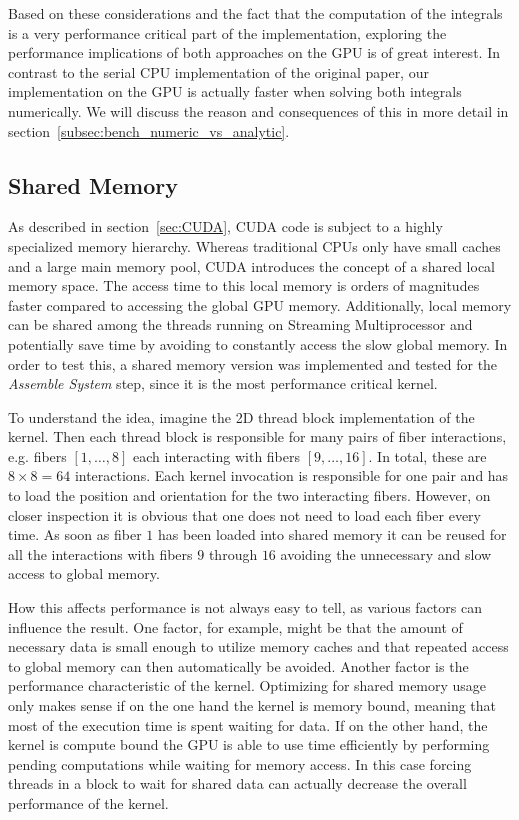 Based on these considerations and the fact that the computation of the integrals is a very performance critical part of the implementation, exploring the performance implications of both approaches on the GPU is of great interest. In contrast to the serial CPU implementation of the original paper, our implementation on the GPU is actually faster when solving both integrals numerically. We will discuss the reason and consequences of this in more detail in section~\ref{subsec:bench_numeric_vs_analytic}.

\subsection{Shared Memory}
\label{subsec:shared_memory}

As described in section~\ref{sec:CUDA}, CUDA code is subject to a highly specialized memory hierarchy. Whereas traditional CPUs only have small caches and a large main memory pool, CUDA introduces the concept of a shared local memory space. The access time to this local memory is orders of magnitudes faster compared to accessing the global GPU memory. Additionally, local memory can be shared among the threads running on Streaming Multiprocessor and potentially save time by avoiding to constantly access the slow global memory. In order to test this, a shared memory version was implemented and tested for the \emph{Assemble System} step, since it is the most performance critical kernel.

To understand the idea, imagine the 2D thread block implementation of the kernel. Then each thread block is responsible for many pairs of fiber interactions, e.g. fibers $[1,\dots,8]$ each interacting with fibers $[9,\dots,16]$. In total, these are $8 \times 8 = 64$ interactions. Each kernel invocation is responsible for one pair and has to load the position and orientation for the two interacting fibers. However, on closer inspection it is obvious that one does not need to load each fiber every time. As soon as fiber $1$ has been loaded into shared memory it can be reused for all the interactions with fibers $9$ through $16$ avoiding the unnecessary and slow access to global memory.

How this affects performance is not always easy to tell, as various factors can influence the result. One factor, for example, might be that the amount of necessary data is small enough to utilize memory caches and that repeated access to global memory can then automatically be avoided. Another factor is the performance characteristic of the kernel. Optimizing for shared memory usage only makes sense if on the one hand the kernel is memory bound, meaning that most of the execution time is spent waiting for data. If on the other hand, the kernel is compute bound the GPU is able to use time efficiently by performing pending computations while waiting for memory access. In this case forcing threads in a block to wait for shared data can actually decrease the overall performance of the kernel.

